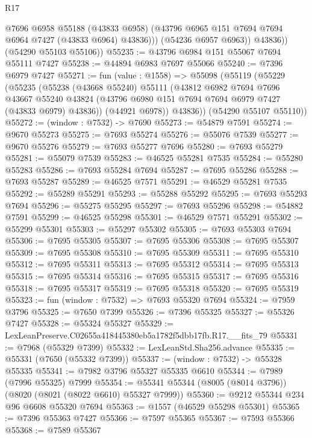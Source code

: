 \begin{lexlean}{R17}
\begin{coremodule}
                @7696
                @6958
                @55188
                (@43833 @6958)
                (@43796 @6965 @151 @7694 @7694 @6964 @7427 (@43833 @6964) @43836)))
            (@54236 @6957 @6963))
          @43836))
      (@54290 @55103 @55106))
@55235 := @43796 @6984 @151 @55067 @7694 @55111 @7427
@55238 := @44894 @6983 @7697 @55066
@55240 := @7396 @6979 @7427
@55271 := fun (value : @1558) =>
  @55098
    (@55119
      (@55229
        (@55235
          (@55238
            (@43668 @55240)
            @55111
            (@43812
              @6982
              @7694
              @7696
              @43667
              @55240
              @43824
              (@43796 @6980 @151 @7694 @7694 @6979 @7427 (@43833 @6979) @43836))
            (@44921 @6978))
          @43836))
      (@54290 @55107 @55110))
@55272 := (window : @7532) -> @7690
@55273 := @54879 @7591
@55274 := @9670 @55273
@55275 := @7693 @55274
@55276 := @55076 @7539
@55277 := @9670 @55276
@55279 := @7693 @55277 @7696
@55280 := @7693 @55279
@55281 := @55079 @7539
@55283 := @46525 @55281 @7535
@55284 := @55280 @55283
@55286 := @7693 @55284 @7694
@55287 := @7695 @55286
@55288 := @7693 @55287
@55289 := @46525 @7571
@55291 := @46529 @55281 @7535
@55292 := @55289 @55291
@55293 := @55288 @55292
@55295 := @7693 @55293 @7694
@55296 := @55275 @55295
@55297 := @7693 @55296
@55298 := @54882 @7591
@55299 := @46525 @55298
@55301 := @46529 @7571 @55291
@55302 := @55299 @55301
@55303 := @55297 @55302
@55305 := @7693 @55303 @7694
@55306 := @7695 @55305
@55307 := @7695 @55306
@55308 := @7695 @55307
@55309 := @7695 @55308
@55310 := @7695 @55309
@55311 := @7695 @55310
@55312 := @7695 @55311
@55313 := @7695 @55312
@55314 := @7695 @55313
@55315 := @7695 @55314
@55316 := @7695 @55315
@55317 := @7695 @55316
@55318 := @7695 @55317
@55319 := @7695 @55318
@55320 := @7695 @55319
@55323 := fun (window : @7532) => @7693 @55320 @7694
@55324 := @7959 @3796
@55325 := @7650 @7399
@55326 := @7396 @55325
@55327 := @55326 @7427
@55328 := @55324 @55327
@55329 := LexLeanPreserve.C02655a418445380eb5a1782f5dbb17fb.R17.__fits_79
@55331 := @7968 (@55329 @7399)
@55332 := LexLeanStd.Sha256.advance
@55335 := @55331 (@7650 (@55332 @7399))
@55337 := (window : @7532) -> @55328 @55335
@55341 := @7982 @3796 @55327 @55335 @6610
@55344 := @7989 (@7996 @55325) @7999
@55354 := @55341 @55344 (@8005 (@8014 @3796)) (@8020 (@8021 (@8022 @6610) @55327 @7999))
@55360 := @9212 @55344 @234 @96 @6608 @55320 @7694
@55363 := @1557 (@46529 @55298 @55301)
@55365 := @7396 @55363 @7427
@55366 := @7597 @55365
@55367 := @7593 @55366
@55368 := @7589 @55367

\end{coremodule}
\end{lexlean}
